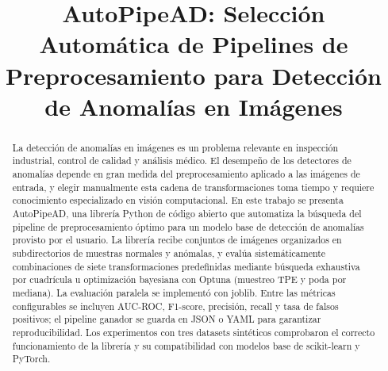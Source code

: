 \documentclass[conference,spanish]{IEEEtran}
\begin{document}
\title{AutoPipeAD: Selección Automática de Pipelines de Preprocesamiento
       para Detección de Anomalías en Imágenes}

\author{%
\and
{}
}

\maketitle

\begin{abstract}
La detección de anomalías en imágenes es un problema relevante en inspección
industrial, control de calidad y análisis médico. El desempeño de los
detectores de anomalías depende en gran medida del preprocesamiento aplicado
a las imágenes de entrada, y elegir manualmente esta cadena de
transformaciones toma tiempo y requiere conocimiento especializado en visión
computacional. En este trabajo se presenta AutoPipeAD, una librería Python de
código abierto que automatiza la búsqueda del pipeline de preprocesamiento
óptimo para un modelo base de detección de anomalías provisto por el usuario.
La librería recibe conjuntos de imágenes organizados en subdirectorios de
muestras normales y anómalas, y evalúa sistemáticamente combinaciones de
siete transformaciones predefinidas mediante
búsqueda exhaustiva por cuadrícula u optimización bayesiana con Optuna
(muestreo TPE y poda por mediana). La evaluación paralela se
implementó con joblib. Entre las métricas
configurables se incluyen AUC-ROC, F1-score, precisión, recall y tasa de
falsos positivos; el pipeline ganador se guarda en JSON o YAML para
garantizar reproducibilidad. Los experimentos con tres datasets sintéticos comprobaron el correcto funcionamiento de la librería y su compatibilidad con modelos base de scikit-learn y PyTorch.
\end{abstract}
\end{document}
